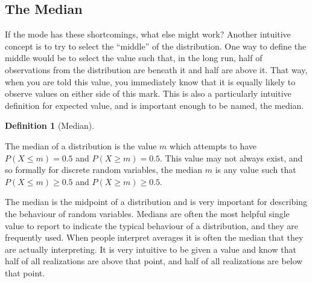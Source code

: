 \documentclass[
  letterpaper,
  DIV=11,
  numbers=noendperiod]{scrreprt}
\theoremstyle{definition}
\newtheorem{definition}{Definition}[chapter]
\theoremstyle{definition}
\theoremstyle{definition}
\theoremstyle{remark}
\begin{document}
\subsection{The Median}\label{the-median}

If the mode has these shortcomings, what else might work? Another
intuitive concept is to try to select the ``middle'' of the
distribution. One way to define the middle would be to select the value
such that, in the long run, half of observations from the distribution
are beneath it and half are above it. That way, when you are told this
value, you immediately know that it is equally likely to observe values
on either side of this mark. This is also a particularly intuitive
definition for expected value, and is important enough to be named, the
median.

\begin{definition}[Median]\protect\hypertarget{def-median}{}\label{def-median}

The median of a distribution is the value \(m\) which attempts to have
\(P(X \leq m) = 0.5\) and \(P(X \geq m) = 0.5\). This value may not
always exist, and so formally for discrete random variables, the median
\(m\) is any value such that \(P(X \leq m) \geq 0.5\) and
\(P(X \geq m) \geq 0.5\).

\end{definition}

The median is the midpoint of a distribution and is very important for
describing the behaviour of random variables. Medians are often the most
helpful single value to report to indicate the typical behaviour of a
distribution, and they are frequently used. When people interpret
averages it is often the median that they are actually interpreting. It
is very intuitive to be given a value and know that half of all
realizations are above that point, and half of all realizations are
below that point.
\end{document}
